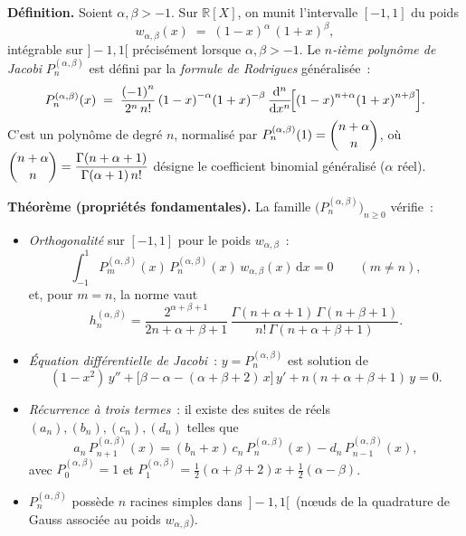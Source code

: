 

\newcommand{\Jac}{P_n^{(\alpha,\beta)}}
\newcommand{\wab}{w_{\alpha,\beta}}


\begin{tcolorbox}[thmbox]
  \textbf{Définition.}\enspace{}
  Soient $\alpha,\beta>-1$. Sur $\mathbb{R}[X]$, on munit l'intervalle
  $[-1,1]$ du poids
  \[
    \wab(x) \;=\; {(1-x)}^{\alpha}\,{(1+x)}^{\beta},
  \]
  intégrable sur $]-1,1[$ précisément lorsque $\alpha,\beta>-1$. Le
  \emph{$n$-ième polynôme de Jacobi} $\Jac$ est défini par la
  \emph{formule de Rodrigues} généralisée~:
  \[
    \Jac(x) \;=\; \frac{{(-1)}^n}{2^n\,n!}\,
    {(1-x)}^{-\alpha}{(1+x)}^{-\beta}\,
    \frac{\mathrm{d}^n}{\mathrm{d}x^n}\!
    \Bigl[{(1-x)}^{n+\alpha}{(1+x)}^{n+\beta}\Bigr].
  \]
  C'est un polynôme de degré $n$, normalisé par
  $\Jac(1)=\dbinom{n+\alpha}{n}$, où
  $\dbinom{n+\alpha}{n}=\dfrac{\Gamma(n+\alpha+1)}{\Gamma(\alpha+1)\,n!}$
  désigne le coefficient binomial généralisé ($\alpha$ réel).

  \medskip
  \textbf{Théorème (propriétés fondamentales).}\enspace%
  La famille ${\bigl(\Jac\bigr)}_{n\geq 0}$ vérifie~:
  \begin{itemize}
    \item \textit{Orthogonalité} sur $[-1,1]$ pour le poids $\wab$~:
    \[
      \int_{-1}^{1} P_m^{(\alpha,\beta)}(x)\,P_n^{(\alpha,\beta)}(x)\,
      \wab(x)\,\mathrm{d}x = 0 \qquad (m\neq n),
    \]
    et, pour $m=n$, la norme vaut
    \[
      h_n^{(\alpha,\beta)}=\frac{2^{\alpha+\beta+1}}{2n+\alpha+\beta+1}\,
      \frac{\Gamma(n+\alpha+1)\,\Gamma(n+\beta+1)}
           {n!\,\Gamma(n+\alpha+\beta+1)}.
    \]
    \item \textit{Équation différentielle de Jacobi}~: $y=\Jac$ est
          solution de
    \[
      (1-x^2)\,y'' + \bigl[\beta-\alpha-(\alpha+\beta+2)\,x\bigr]\,y'
      + n(n+\alpha+\beta+1)\,y = 0.
    \]
    \item \textit{Récurrence à trois termes}~: il existe des suites de
          réels $(a_n),(b_n),(c_n),(d_n)$ telles que
    \[
      a_n\,P_{n+1}^{(\alpha,\beta)}(x)
      = (b_n+x)\,c_n\,P_n^{(\alpha,\beta)}(x)
      - d_n\,P_{n-1}^{(\alpha,\beta)}(x),
    \]
    avec $P_0^{(\alpha,\beta)}=1$ et
    $P_1^{(\alpha,\beta)}=\tfrac12(\alpha+\beta+2)x+\tfrac12(\alpha-\beta)$.
    \item $\Jac$ possède $n$ racines simples dans $\,]-1,1[\,$ (nœuds de
          la quadrature de Gauss associée au poids $\wab$).
  \end{itemize}


\end{tcolorbox}
